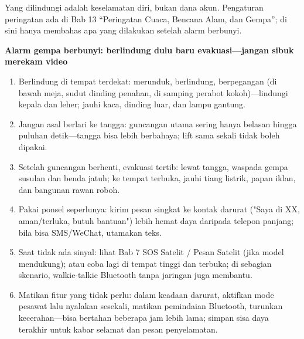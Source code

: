 


Yang dilindungi adalah keselamatan diri, bukan dana akun. Pengaturan peringatan ada di Bab 13 “Peringatan Cuaca, Bencana Alam, dan Gempa”; di sini hanya membahas apa yang dilakukan setelah alarm berbunyi.

\textbf{Alarm gempa berbunyi: berlindung dulu baru evakuasi—jangan sibuk merekam video}\par

\begin{enumerate}
  \item Berlindung di tempat terdekat: merunduk, berlindung, berpegangan (di bawah meja, sudut dinding penahan, di samping perabot kokoh)—lindungi kepala dan leher; jauhi kaca, dinding luar, dan lampu gantung.
  \item Jangan asal berlari ke tangga: guncangan utama sering hanya belasan hingga puluhan detik—tangga bisa lebih berbahaya; lift sama sekali tidak boleh dipakai.
  \item Setelah guncangan berhenti, evakuasi tertib: lewat tangga, waspada gempa susulan dan benda jatuh; ke tempat terbuka, jauhi tiang listrik, papan iklan, dan bangunan rawan roboh.
  \item Pakai ponsel seperlunya: kirim pesan singkat ke kontak darurat ("Saya di XX, aman/terluka, butuh bantuan") lebih hemat daya daripada telepon panjang; bila bisa SMS/WeChat, utamakan teks.
  \item Saat tidak ada sinyal: lihat Bab 7 SOS Satelit / Pesan Satelit (jika model mendukung); atau coba lagi di tempat tinggi dan terbuka; di sebagian skenario, walkie-talkie Bluetooth tanpa jaringan juga membantu.
  \item Matikan fitur yang tidak perlu: dalam keadaan darurat, aktifkan mode pesawat lalu nyalakan sesekali, matikan pemindaian Bluetooth, turunkan kecerahan—bisa bertahan beberapa jam lebih lama; simpan sisa daya terakhir untuk kabar selamat dan pesan penyelamatan.
\end{enumerate}

